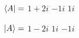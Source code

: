 \documentclass[10pt,a4paper]{article}
\begin{document}
$\bra{A}=$
$1+2i$	$-1i$	$1i$	
 
$\ket{A}=$
$1-2i$	$1i$	$-1i$	
\end{document}
